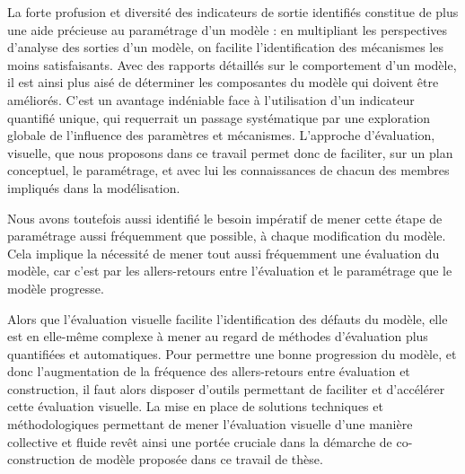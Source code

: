 La forte profusion et diversité des indicateurs de sortie identifiés constitue de plus une aide précieuse au paramétrage d'un modèle : en multipliant les perspectives d'analyse des sorties d'un modèle, on facilite l'identification des mécanismes les moins satisfaisants.
Avec des rapports détaillés sur le comportement d'un modèle, il est ainsi plus aisé de déterminer les composantes du modèle qui doivent être améliorés.
C'est un avantage indéniable face à l'utilisation d'un indicateur quantifié unique, qui requerrait un passage systématique par une exploration globale de l'influence des paramètres et mécanismes.
L'approche d'évaluation, visuelle, que nous proposons dans ce travail permet donc de faciliter, sur un plan conceptuel, le paramétrage, et avec lui les connaissances de chacun des membres impliqués dans la modélisation.

Nous avons toutefois aussi identifié le besoin impératif de mener cette étape de paramétrage aussi fréquemment que possible, à chaque modification du modèle.
Cela implique la nécessité de mener tout aussi fréquemment une évaluation du modèle, car c'est par les allers-retours entre l'évaluation et le paramétrage que le modèle progresse.

Alors que l'évaluation visuelle facilite l'identification des défauts du modèle, elle est en elle-même complexe à mener au regard de méthodes d'évaluation plus quantifiées et automatiques.
Pour permettre une bonne progression du modèle, et donc l'augmentation de la fréquence des allers-retours entre évaluation et construction, il faut alors disposer d'outils permettant de faciliter et d'accélérer cette évaluation visuelle.
La mise en place de solutions techniques et méthodologiques permettant de mener l'évaluation visuelle d'une manière collective et fluide revêt ainsi une portée cruciale dans la démarche de co-construction de modèle proposée dans ce travail de thèse.
